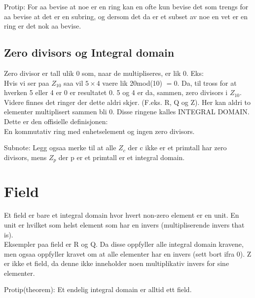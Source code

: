 \documentclass[12pt,a4paper]{article}
\begin{document}
Protip: For aa bevise at noe er en ring kan en ofte kun bevise det som trengs for aa bevise at det er en subring, og dersom det da er et subset av noe en vet er en ring er det nok aa bevise.

\subsection*{Zero divisors og Integral domain}
Zero divisor er tall ulik 0 som, naar de multipliseres, er lik 0. Eks:\\
Hvis vi ser paa $Z_{10}$ saa vil $5 \times 4$ vaere lik 20mod(10) $= 0$. Da, til tross for at hverken 5 eller 4 er 0 er resultatet 0. 5 og 4 er da, sammen, zero divisors i $Z_{10}$. \\

Videre finnes det ringer der dette aldri skjer. (F.eks. R, Q og Z). Her kan aldri to elementer multiplisert sammen bli 0. Disse ringene kalles INTEGRAL DOMAIN. Dette er den offisielle definisjonen:\\
En kommutativ ring med enhetselement og ingen zero divisors.

Subnote: Legg ogsaa merke til at alle $Z_c$ der c ikke er et primtall har zero divisors, mens $Z_p$ der p er et primtall er et integral domain. 

\section*{Field}
Et field er bare et integral domain hvor hvert non-zero element er en unit. En unit er hvilket som helst element som har en invers (multipliserende invers that is). \\
Eksempler paa field er R og Q. Da disse oppfyller alle integral domain kravene, men ogsaa oppfyller kravet om at alle elementer har en invers (sett bort ifra 0). Z er ikke et field, da denne ikke inneholder noen multiplikativ invers for sine elementer. 

Protip(theorem): Et endelig integral domain er alltid ett field. 
\end{document}
